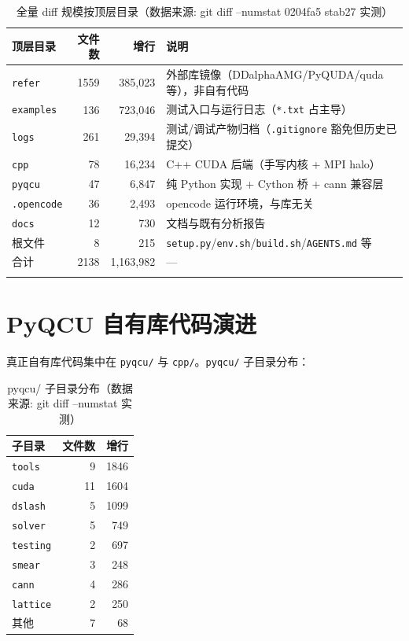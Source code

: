 \documentclass[UTF8]{ctexart}
\begin{document}
\begin{xltabular}{\textwidth}{lrrX}
\toprule
\textcolor{struct}{顶层目录} & 文件数 & 增行 & 说明 \\
\midrule
\endhead
\texttt{refer} & 1559 & 385,023 & 外部库镜像（DDalphaAMG/PyQUDA/quda 等），非自有代码 \\
\texttt{examples} & 136 & 723,046 & 测试入口与运行日志（\texttt{*.txt} 占主导） \\
\texttt{logs} & 261 & 29,394 & 测试/调试产物归档（\texttt{.gitignore} 豁免但历史已提交） \\
\texttt{cpp} & 78 & 16,234 & C++ CUDA 后端（手写内核 + MPI halo） \\
\texttt{pyqcu} & 47 & 6,847 & 纯 Python 实现 + Cython 桥 + cann 兼容层 \\
\texttt{.opencode} & 36 & 2,493 & opencode 运行环境，与库无关 \\
\texttt{docs} & 12 & 730 & 文档与既有分析报告 \\
根文件 & 8 & 215 & \texttt{setup.py}/\texttt{env.sh}/\texttt{build.sh}/\texttt{AGENTS.md} 等 \\
合计 & 2138 & 1,163,982 & — \\
\bottomrule
\caption{全量 diff 规模按顶层目录（数据来源: git diff --numstat 0204fa5 stab27 实测）}
\end{xltabular}

\section{PyQCU 自有库代码演进}

真正自有库代码集中在 \texttt{pyqcu/} 与 \texttt{cpp/}。\texttt{pyqcu/} 子目录分布：

\begin{table}[htbp]\centering
\begin{tabular}{lrr}
\toprule
子目录 & 文件数 & 增行 \\
\midrule
\texttt{tools} & 9 & 1846 \\
\texttt{cuda} & 11 & 1604 \\
\texttt{dslash} & 5 & 1099 \\
\texttt{solver} & 5 & 749 \\
\texttt{testing} & 2 & 697 \\
\texttt{smear} & 3 & 248 \\
\texttt{cann} & 4 & 286 \\
\texttt{lattice} & 2 & 250 \\
其他 & 7 & 68 \\
\bottomrule
\end{tabular}
\caption{pyqcu/ 子目录分布（数据来源: git diff --numstat 实测）}
\end{table}
\end{document}
